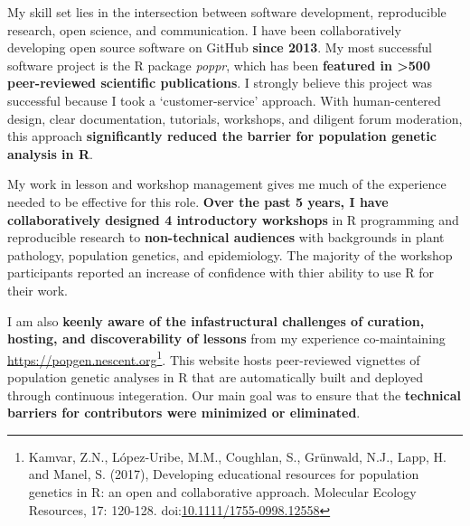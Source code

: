\vspace{1ex}






My skill set lies in the intersection between software development,
reproducible research, open science, and communication.  I have been
collaboratively developing open source software on GitHub
\textbf{since 2013}. My most successful software project is the R package
\textit{poppr}, which has been \textbf{featured in \textgreater500
peer-reviewed scientific publications}. I strongly believe this project was
successful because I took a `customer-service' approach.  With
human-centered design, clear documentation, tutorials, workshops, and diligent
forum moderation, this approach \textbf{significantly reduced the barrier for
population genetic analysis in R}.

\vspace{1ex}

My work in lesson and workshop management gives me much of the experience
needed to be effective for this role. \textbf{Over the past 5 years, I have
collaboratively designed 4 introductory workshops} in R programming and
reproducible research to \textbf{non-technical audiences} with backgrounds in
plant pathology, population genetics, and epidemiology. The majority of the
workshop participants reported an increase of confidence with thier ability to
use R for their work.

\vspace{1ex}

I am also \textbf{keenly aware of the infastructural challenges of curation, hosting,
and discoverability of lessons} from my experience co-maintaining
\url{https://popgen.nescent.org}\footnote{Kamvar, Z.N., López‐Uribe, M.M.,
Coughlan, S., Grünwald, N.J., Lapp, H. and Manel, S. (2017), Developing
educational resources for population genetics in R: an open and collaborative
approach. Molecular Ecology Resources, 17: 120-128.
doi:\href{https://doi.org/10.1111/1755-0998.12558}{10.1111/1755-0998.12558}}.
This website hosts peer-reviewed vignettes of population
genetic analyses in R that are automatically built and deployed through
continuous integeration. Our main goal was to ensure that the
\textbf{technical barriers for contributors were minimized or eliminated}.

